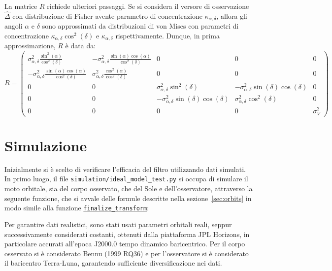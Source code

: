 \documentclass[12pt,a4paper,openright,twoside]{book}
\begin{document}
La matrice $R$ richiede ulteriori passaggi. Se si considera il versore di osservazione $\hat{\Delta}$ con distribuzione di Fisher avente parametro di concentrazione $\kappa_{\alpha,\delta}$, allora gli angoli $\alpha$ e $\delta$ sono approssimati da distribuzioni di von Mises con parametri di concentrazione $\kappa_{\alpha,\delta}\cos^2(\delta)$ e $\kappa_{\alpha,\delta}$ rispettivamente. Dunque, in prima approssimazione, $R$ è data da:
\begin{equation}
R=\left(\begin{smallmatrix}
\sigma_{\alpha,\delta}^2\tfrac{\sin^2(\alpha)}{\cos^2(\delta)} & -\sigma_{\alpha,\delta}^2\tfrac{\sin(\alpha)\cos(\alpha)}{\cos^2(\delta)} & 0 & 0 & 0 \\
-\sigma_{\alpha,\delta}^2\tfrac{\sin(\alpha)\cos(\alpha)}{\cos^2(\delta)} & \sigma_{\alpha,\delta}^2\tfrac{\cos^2(\alpha)}{\cos^2(\delta)} & 0 & 0 & 0 \\
0 & 0 & \sigma_{\alpha,\delta}^2\sin^2(\delta) & -\sigma_{\alpha,\delta}^2\sin(\delta)\cos(\delta) & 0 \\
0 & 0 & -\sigma_{\alpha,\delta}^2\sin(\delta)\cos(\delta) & \sigma_{\alpha,\delta}^2\cos^2(\delta) & 0 \\
0 & 0 & 0 & 0 & \sigma_V^2
\end{smallmatrix}\right)
\end{equation}

\section{Simulazione}

Inizialmente si è scelto di verificare l'efficacia del filtro utilizzando dati simulati. In primo luogo, il file \lstinline{simulation/ideal_model_test.py} si occupa di simulare il moto orbitale, sia del corpo osservato, che del Sole e dell'osservatore, attraverso la seguente funzione, che si avvale delle formule descritte nella sezione~\ref{sec:orbits} in modo simile alla funzione \hyperref[lst:finalize-transform]{\lstinline{finalize_transform}}:



Per garantire dati realistici, sono stati usati parametri orbitali reali, seppur successivamente considerati costanti, ottenuti dalla piattaforma JPL Horizons, in particolare accurati all'epoca J2000.0 tempo dinamico baricentrico. Per il corpo osservato si è considerato Bennu (1999 RQ36) e per l'osservatore si è considerato il baricentro Terra-Luna, garantendo sufficiente diversificazione nei dati.
\end{document}
